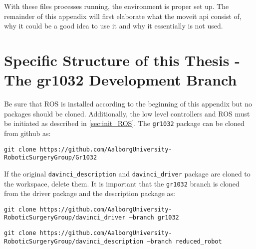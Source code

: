With these files processes running, the environment is proper set up. The remainder of this appendix will first elaborate what the moveit \gls{api} consist of, why it could be a good idea to use it and why it essentially is not used.
\section{Specific Structure of this Thesis - The gr1032 Development Branch}\label{appsec:ros_development}
Be sure that ROS is installed according to the beginning of this appendix but no packages should be cloned. Additionally, the low level controllers and ROS must be initiated as described in \autoref{sec:init_ROS}. The \texttt{gr1032} package can be cloned from github as:
\vspace{0.2cm}


\hspace{0.0cm}  \texttt{git clone https://github.com/AalborgUniversity-RoboticSurgeryGroup/Gr1032}
\vspace{0.2cm}


If the original \texttt{davinci\_description} and \texttt{davinci\_driver} package are cloned to the workspace, delete them. It is important that the \texttt{gr1032} branch is cloned from the driver package and the description package as:
\vspace{0.2cm}

\hspace{0.0cm}  \texttt{git clone https://github.com/AalborgUniversity-RoboticSurgeryGroup/davinci\_driver ---branch gr1032}
\vspace{0.2cm}


\hspace{0.0cm}  \texttt{git clone https://github.com/AalborgUniversity-RoboticSurgeryGroup/davinci\_description ---branch reduced\_robot}
\vspace{0.2cm}


